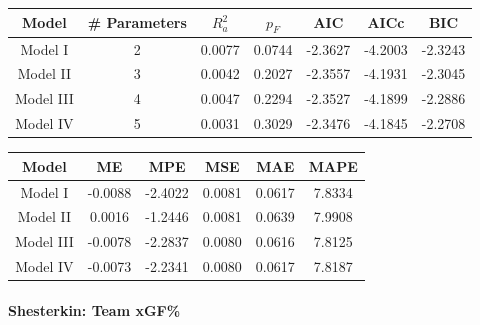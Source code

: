 \documentclass[
  10pt,
]{extarticle}
\begin{document}
\begin{center}
\normalsize

\begin{tabular}{ccccccc}
\toprule
Model & \# Parameters & $R_a^2$ & $p_F$ & AIC & AICc & BIC\\
\midrule
Model I & 2 & 0.0077 & 0.0744 & -2.3627 & -4.2003 & -2.3243\\
Model II & 3 & 0.0042 & 0.2027 & -2.3557 & -4.1931 & -2.3045\\
Model III & 4 & 0.0047 & 0.2294 & -2.3527 & -4.1899 & -2.2886\\
Model IV & 5 & 0.0031 & 0.3029 & -2.3476 & -4.1845 & -2.2708\\
\bottomrule
\end{tabular}
\normalsize
\end{center}
\begin{center}
\normalsize

\begin{tabular}{cccccc}
\toprule
Model & ME & MPE & MSE & MAE & MAPE\\
\midrule
Model I & -0.0088 & -2.4022 & 0.0081 & 0.0617 & 7.8334\\
Model II & 0.0016 & -1.2446 & 0.0081 & 0.0639 & 7.9908\\
Model III & -0.0078 & -2.2837 & 0.0080 & 0.0616 & 7.8125\\
Model IV & -0.0073 & -2.2341 & 0.0080 & 0.0617 & 7.8187\\
\bottomrule
\end{tabular}
\normalsize
\end{center}

\paragraph{Shesterkin: Team xGF\%}\label{shesterkin-team-xgf}
\end{document}
